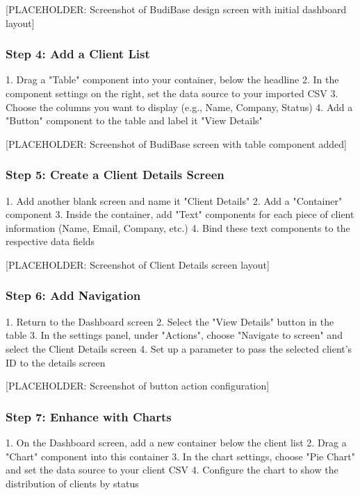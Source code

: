 [PLACEHOLDER: Screenshot of BudiBase design screen with initial dashboard layout]

\subsubsection{Step 4: Add a Client List}

1. Drag a "Table" component into your container, below the headline
2. In the component settings on the right, set the data source to your imported CSV
3. Choose the columns you want to display (e.g., Name, Company, Status)
4. Add a "Button" component to the table and label it "View Details"

[PLACEHOLDER: Screenshot of BudiBase screen with table component added]

\subsubsection{Step 5: Create a Client Details Screen}

1. Add another blank screen and name it "Client Details"
2. Add a "Container" component
3. Inside the container, add "Text" components for each piece of client information (Name, Email, Company, etc.)
4. Bind these text components to the respective data fields

[PLACEHOLDER: Screenshot of Client Details screen layout]

\subsubsection{Step 6: Add Navigation}

1. Return to the Dashboard screen
2. Select the "View Details" button in the table
3. In the settings panel, under "Actions", choose "Navigate to screen" and select the Client Details screen
4. Set up a parameter to pass the selected client's ID to the details screen

[PLACEHOLDER: Screenshot of button action configuration]

\subsubsection{Step 7: Enhance with Charts}

1. On the Dashboard screen, add a new container below the client list
2. Drag a "Chart" component into this container
3. In the chart settings, choose "Pie Chart" and set the data source to your client CSV
4. Configure the chart to show the distribution of clients by status

